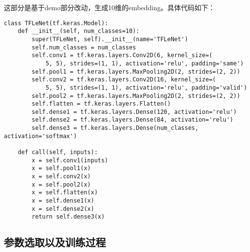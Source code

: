 \documentclass{article}
\begin{document}
这部分是基于demo部分改动，生成10维的embedding。具体代码如下：

\begin{lstlisting}
class TFLeNet(tf.keras.Model):
	def __init__(self, num_classes=10):
		super(TFLeNet, self).__init__(name='TFLeNet')
		self.num_classes = num_classes
		self.conv1 = tf.keras.layers.Conv2D(6, kernel_size=(
			5, 5), strides=(1, 1), activation='relu', padding='same')
		self.pool1 = tf.keras.layers.MaxPooling2D(2, strides=(2, 2))
		self.conv2 = tf.keras.layers.Conv2D(16, kernel_size=(
			5, 5), strides=(1, 1), activation='relu', padding='valid')
		self.pool2 = tf.keras.layers.MaxPooling2D(2, strides=(2, 2))
		self.flatten = tf.keras.layers.Flatten()
		self.dense1 = tf.keras.layers.Dense(120, activation='relu')
		self.dense2 = tf.keras.layers.Dense(84, activation='relu')
		self.dense3 = tf.keras.layers.Dense(num_classes, activation='softmax')

	def call(self, inputs):
		x = self.conv1(inputs)
		x = self.pool1(x)
		x = self.conv2(x)
		x = self.pool2(x)
		x = self.flatten(x)
		x = self.dense1(x)
		x = self.dense2(x)
		return self.dense3(x)
\end{lstlisting}

\subsection{参数选取以及训练过程}
\end{document}
